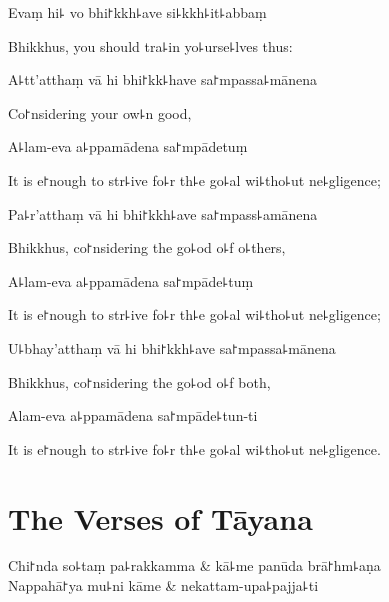 Evaṃ hi꜕ vo bhi꜓kkh꜕ave si꜕kkh꜕it꜕abbaṃ

\begin{english}
  Bhikkhus, you should tra꜕in yo꜕urse꜕lves thus:
\end{english}

A꜕tt'atthaṃ vā hi bhi꜓kk꜕have sa꜓mpassa꜕mānena

\begin{english}
  Co꜓nsidering your ow꜕n good,
\end{english}

A꜕lam-eva a꜕ppamādena sa꜓mpādetuṃ

\begin{english}
  It is e꜓nough to str꜕ive fo꜕r th꜕e go꜕al wi꜕tho꜕ut ne꜕gligence;
\end{english}

Pa꜕r'atthaṃ vā hi bhi꜓kkh꜕ave sa꜓mpass꜕amānena

\begin{english}
  Bhikkhus, co꜓nsidering the go꜕od o꜕f o꜕thers,
\end{english}

A꜕lam-eva a꜕ppamādena sa꜓mpāde꜕tuṃ

\begin{english}
  It is e꜓nough to str꜕ive fo꜕r th꜕e go꜕al wi꜕tho꜕ut ne꜕gligence;
\end{english}

U꜕bhay'atthaṃ vā hi bhi꜓kkh꜕ave sa꜓mpassa꜕mānena

\begin{english}
  Bhikkhus, co꜓nsidering the go꜕od o꜕f both,
\end{english}

Alam-eva a꜕ppamādena sa꜓mpāde꜕tun-ti

\begin{english}
  It is e꜓nough to str꜕ive fo꜕r th꜕e go꜕al wi꜕tho꜕ut ne꜕gligence.
\end{english}

\chapter{The Verses of Tāyana}%



\begin{leader}
\end{leader}

\begin{twochants}
  Chi꜓nda so꜕taṃ pa꜕rakkamma & kā꜕me panūda brā꜓hm꜕aṇa \\
  Nappahā꜓ya mu꜕ni kāme & nekattam-upa꜕pajja꜕ti \\
\end{twochants}

